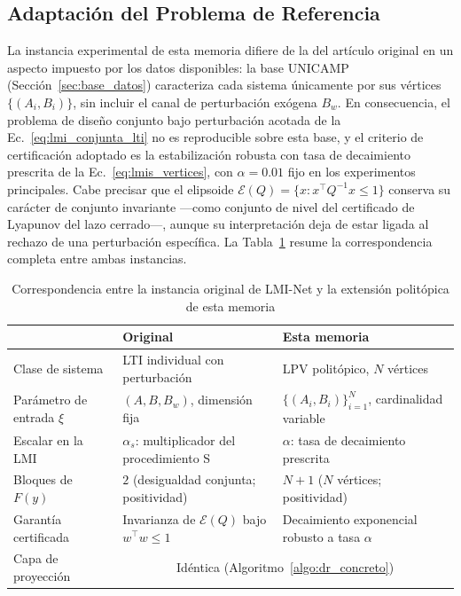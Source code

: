 \subsection{Adaptación del Problema de Referencia}
\label{subsec:adaptacion_db}

La instancia experimental de esta memoria difiere de la del artículo original en un 
aspecto impuesto por los datos disponibles: la base UNICAMP 
(Sección~\ref{sec:base_datos}) caracteriza cada sistema únicamente por sus vértices 
$\{(A_i, B_i)\}$, sin incluir el canal de perturbación exógena $B_w$. En consecuencia, 
el problema de diseño conjunto bajo perturbación acotada de la 
Ec.~\eqref{eq:lmi_conjunta_lti} no es reproducible sobre esta base, y el criterio de 
certificación adoptado es la estabilización robusta con tasa de decaimiento prescrita 
de la Ec.~\eqref{eq:lmis_vertices}, con $\alpha = 0.01$ fijo en los experimentos 
principales. Cabe precisar que el elipsoide $\mathcal{E}(Q) = \{x : x^\top Q^{-1} x 
\le 1\}$ conserva su carácter de conjunto invariante ---como conjunto de nivel del 
certificado de Lyapunov del lazo cerrado---, aunque su interpretación deja de estar 
ligada al rechazo de una perturbación específica. La Tabla~\ref{tab:migracion} resume 
la correspondencia completa entre ambas instancias.

\begin{table}[htpb]
\centering
\caption{Correspondencia entre la instancia original de LMI-Net y la extensión 
politópica de esta memoria}
\label{tab:migracion}
\begin{tabular}{@{}p{3.6cm}p{4.8cm}p{4.8cm}@{}}
\toprule
 & \textbf{Original \cite{tang2026lminet}} & \textbf{Esta memoria} \\ \midrule
Clase de sistema & LTI individual con perturbación & LPV politópico, $N$ vértices \\
Parámetro de entrada $\xi$ & $(A, B, B_w)$, dimensión fija & $\{(A_i, B_i)\}_{i=1}^N$, 
cardinalidad variable \\
Escalar en la LMI & $\alpha_s$: multiplicador del procedimiento S & $\alpha$: tasa de 
decaimiento prescrita \\
Bloques de $F(y)$ & $2$ (desigualdad conjunta; positividad) & $N+1$ ($N$ vértices; 
positividad) \\
Garantía certificada & Invarianza de $\mathcal{E}(Q)$ bajo $w^\top w \le 1$ & Decaimiento 
exponencial robusto a tasa $\alpha$ \\
Capa de proyección & \multicolumn{2}{c}{Idéntica (Algoritmo~\ref{algo:dr_concreto})} \\ 
\bottomrule
\end{tabular}
\end{table}














